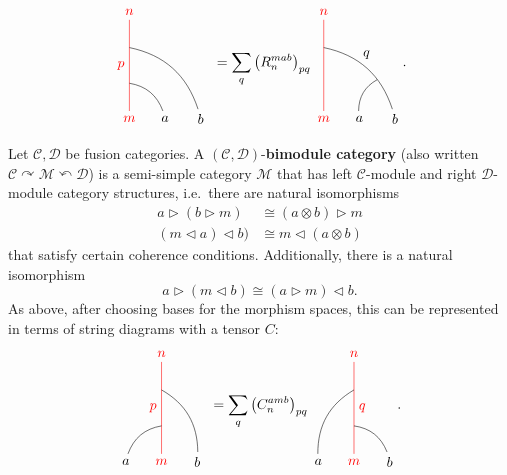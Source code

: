 \begin{definition}
\begin{equation}
			\begin{tikzpicture}[scale=0.9,baseline=(current bounding box.center)]
			\node[red](m) at (0,0) {$m$};
			\node(b) at (1,0) {$a$};
			\node(a) at (2,0) {$b$};
			\node[red](abm) at (0,3) {$n$};
			\draw[red] (m) to node [left] {$p$} (abm);
			\draw (b) to [bend right] (0,1);
			\draw (a) to [bend right] (0,2);
			\end{tikzpicture}\ =\sum_q\left(R_n^{mab}\right)_{pq}
			\begin{tikzpicture}[scale=0.9,baseline=(current bounding box.center)]
			\node[red](m) at (0,0) {$m$};
			\node(b) at (1,0) {$a$};
			\node(a) at (2,0) {$b$};
			\node[red](abm) at (0,3) {$n$};
			\node(ab) at (1.2,1.8) {$q$};
			\draw[red] (m) to (abm);
			\draw (b) to [bend left] (1.5,1.1);
			\draw (a) to [bend right] (0,2);
			\end{tikzpicture}.
		\end{equation}
	
\begin{definition}
	Let $\mathcal{C}, \mathcal{D}$ be fusion categories. A $(\mathcal{C},\mathcal{D})$-\textbf{bimodule category} (also written $\mathcal{C}\curvearrowright\mathcal{M}\curvearrowleft\mathcal{D}$) is a semi-simple category $\mathcal{M}$ that has left $\mathcal{C}$-module and right $\mathcal{D}$-module category structures, i.e.\ there are natural isomorphisms 
		\begin{align}
			a\triangleright(b\triangleright m)&\cong(a\otimes b)\triangleright m\\ 
			(m\triangleleft a)\triangleleft b)&\cong m\triangleleft(a\otimes b)
		\end{align}
	that satisfy certain coherence conditions. Additionally, there is a natural isomorphism 
		\begin{equation}
			a\triangleright(m\triangleleft b)\cong (a\triangleright m)\triangleleft b.
		\end{equation}
	As above, after choosing bases for the morphism spaces, this can be represented in terms of string diagrams with a tensor $C$:
		\begin{equation}
			\begin{tikzpicture}[scale=0.9,baseline=(current bounding box.center)]
			\node[red](m) at (0,0) {$m$};
			\node(a) at (-1,0) {$a$};
			\node(b) at (1,0) {$b$};
			\node[red](abm) at (0,3) {$n$};
			\draw[red] (m) to node [left] {$p$} (abm);
			\draw (a) to [bend left] (0,1);
			\draw (b) to [bend right] (0,2);
			\end{tikzpicture}\ =\sum_q\left(C_n^{amb}\right)_{pq}
			\begin{tikzpicture}[scale=0.9,baseline=(current bounding box.center)]
			\node[red](m) at (0,0) {$m$};
			\node(a) at (-1,0) {$a$};
			\node(b) at (1,0) {$b$};
			\node[red](abm) at (0,3) {$n$};
			\draw[red] (m) to node [right] {$q$} (abm);
			\draw (b) to [bend right] (0,1);
			\draw (a) to [bend left] (0,2);
			\end{tikzpicture}.
		\end{equation}
\end{definition}

\end{definition}